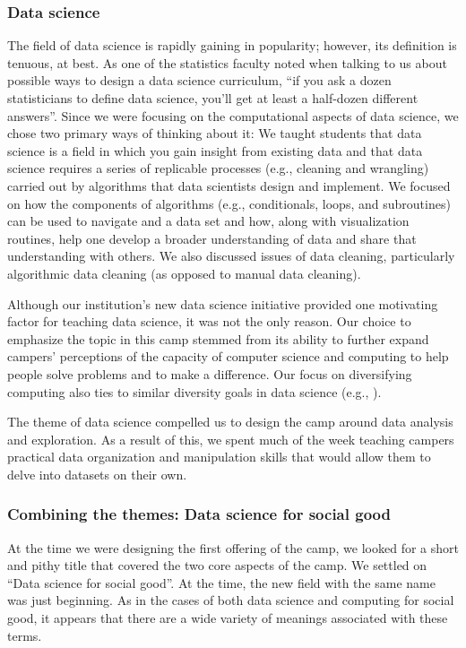 \subsubsection{Data science}

The field of data science is rapidly gaining in popularity; however,
its definition is tenuous, at best.  As one of the statistics faculty
noted when talking to us about possible ways to design a data science
curriculum, ``if you ask a dozen statisticians to define data
science, you'll get at least a half-dozen different answers''.
Since we were focusing on the computational aspects of data science,
we chose two primary ways of thinking about it: We taught students
that data science is a field in which you gain insight from existing
data and that data science requires a series of replicable processes
(e.g., cleaning and wrangling) carried out by algorithms that data
scientists design and implement.  We focused on how the components
of algorithms (e.g., conditionals,  loops, and subroutines) can be
used to navigate and a data set and how, along with visualization
routines, help one develop a broader understanding of data and share
that understanding with others.  We also discussed issues of data
cleaning, particularly algorithmic data cleaning (as opposed to
manual data cleaning).

Although our institution's new data science initiative provided one
motivating factor for teaching data science, it was not the only
reason.  Our choice to emphasize the topic in this camp stemmed
from its ability to further expand campers' perceptions of the
capacity of computer science and computing to help people solve problems
and to make a difference.  Our focus on diversifying computing also
ties to similar diversity goals in data science (e.g., \cite{Berman2015}).

The theme of data science compelled us to design the camp around
data analysis and exploration. As a result of this, we spent much
of the week teaching campers practical data organization and
manipulation skills that would allow them to delve into datasets
on their own.

\subsubsection{Combining the themes: Data science for social good}

At the time we were designing the first offering of the camp, we looked
for a short and pithy title that covered the two core aspects of the camp.
We settled on ``Data science for social good''.  At the time, the
new field with the same name was just beginning.  As in the cases of
both data science and computing for social good, it appears that there
are a wide variety of meanings associated with these terms.

